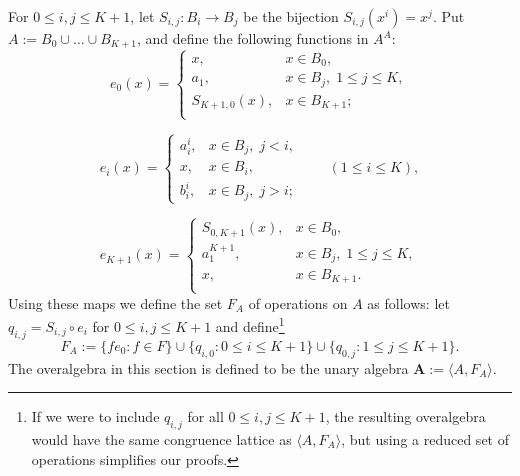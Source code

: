 \documentclass[cm,dissertation]{uhthesis}
\theoremstyle{plain}
\theoremstyle{definition}
\theoremstyle{remark}
\numberwithin{theorem}{section}
\numberwithin{claim}{chapter}
\numberwithin{equation}{section}
\numberwithin{conjecture}{chapter}
\newcommand{\<}{\ensuremath{\langle}}
\renewcommand{\>}{\ensuremath{\rangle}}
\renewcommand{\leq}{\ensuremath{\leqslant}}
\newcommand{\supi}{\ensuremath{^{i}}}
\newcommand{\supj}{\ensuremath{^{j}}}
\newcommand{\0}{\ensuremath{\mathbf{0}}}
\newcommand{\1}{\ensuremath{\mathbf{1}}}
\newcommand{\2}{\ensuremath{\mathbf{2}}}
\newcommand{\3}{\ensuremath{\mathbf{3}}}
\newcommand{\4}{\ensuremath{\mathbf{4}}}
\newcommand{\5}{\ensuremath{\mathbf{5}}}
\newcommand{\bA}{\ensuremath{\mathbf{A}}}
\begin{document}
For $0\leq i, j \leq K+1$, let $S_{i,j}:B_i \rightarrow B_j $ be the 
bijection $S_{i,j}(x\supi)=x\supj$.
Put $A:=B_0\cup \dots\cup B_{K+1}$, and define the following functions in $A^A$:
\[
e_0(x)=
\begin{cases}
  x, & x\in B_0,\\
  a_1, &x\in B_j,\; 1\leq j \leq K,\\
  S_{K+1,0}(x), &x\in B_{K+1};\\
\end{cases}
\]

\[
e_i(x)=
\begin{cases}
  a_i^{i}, &x\in B_j,\; j<i,\\
  x, &x\in B_i,\\
  b_i^{i},&x\in B_j, \;j>i;
\end{cases} \qquad (1\leq i\leq K),
\]

\[
e_{K+1}(x)=
\begin{cases}
  S_{0,K+1}(x), &x\in B_0,\\
  a_{1}^{K+1}, &x\in B_j,\; 1\leq j \leq K,\\
  x, &x \in B_{K+1}.\\
\end{cases}
\]
Using these maps we define the set $F_A$ of operations on $A$ as follows: let
$q_{i,j}=S_{i,j}\circ e_i$ 
for $0\leq i, j\leq K+1$ and
define\footnote{If we were to include $q_{i,j}$
  for all $0\leq i, j\leq K+1$, the resulting overalgebra would have the same
  congruence lattice as $\<A, F_A\>$, but using a reduced set of
  operations simplifies our proofs.}  
\[
F_A := \{f e_0 : f\in F\}  \cup \{q_{i,0} : 0\leq i \leq K+1\}\cup \{q_{0,j} : 1\leq j \leq K+1\}.
\]
The overalgebra in this section is defined to be the unary algebra 
$\bA := \< A, F_A\>$.   
\end{document}
